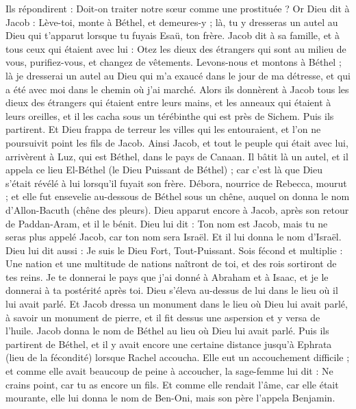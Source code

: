 \begin{multicols}{2}
Ils répondirent : Doit-on traiter notre sœur comme une prostituée ?
\VerseOne{}Or Dieu dit à Jacob : Lève-toi, monte à Béthel, et demeures-y ; là, tu y dresseras un autel au Dieu qui t'apparut lorsque tu fuyais Esaü, ton frère.
Jacob dit à sa famille, et à tous ceux qui étaient avec lui : Otez les dieux des étrangers qui sont au milieu de vous, purifiez-vous, et changez de vêtements.
Levons-nous et montons à Béthel ; là je dresserai un autel au Dieu qui m'a exaucé dans le jour de ma détresse, et qui a été avec moi dans le chemin où j'ai marché.
Alors ils donnèrent à Jacob tous les dieux des étrangers qui étaient entre leurs mains, et les anneaux qui étaient à leurs oreilles, et il les cacha sous un térébinthe qui est près de Sichem.
Puis ils partirent. Et Dieu frappa de terreur les villes qui les entouraient, et l’on ne poursuivit point les fils de Jacob.
Ainsi Jacob, et tout le peuple qui était avec lui, arrivèrent à Luz, qui est Béthel, dans le pays de Canaan.
Il bâtit là un autel, et il appela ce lieu El-Béthel (le Dieu Puissant de Béthel) ; car c’est là que Dieu s’était révélé à lui lorsqu’il fuyait son frère.
Débora,  nourrice de Rebecca, mourut ; et elle fut ensevelie au-dessous de Béthel sous un chêne, auquel on donna le nom d’Allon-Bacuth (chêne des pleurs).
Dieu apparut encore à Jacob, après son retour de Paddan-Aram, et il le bénit.
Dieu lui dit : Ton nom est Jacob, mais tu ne seras plus appelé Jacob, car ton nom sera Israël. Et il lui donna le nom d’Israël.
Dieu lui dit aussi : Je suis le Dieu Fort, Tout-Puissant. Sois fécond et multiplie : Une nation et une multitude de nations naîtront de toi, et des rois sortiront de tes reins.
Je te donnerai le pays que j'ai donné à Abraham et à Isaac, et je le donnerai à ta postérité après toi.
Dieu s’éleva au-dessus de lui dans le lieu où il lui avait parlé.
Et Jacob dressa un monument dans le lieu où Dieu lui avait parlé, à savoir un monument de pierre, et il fit dessus une aspersion et y versa de l'huile.
Jacob donna le nom de Béthel au lieu où Dieu lui avait parlé.
Puis ils partirent de Béthel, et il y avait encore une certaine distance jusqu’à Ephrata (lieu de la fécondité) lorsque Rachel accoucha. Elle eut un accouchement difficile ;
et comme elle avait beaucoup de peine à accoucher, la sage-femme lui dit : Ne crains point, car tu as encore un fils.
Et comme elle rendait l'âme, car elle était mourante, elle lui donna le nom de Ben-Oni, mais son père l’appela Benjamin.

\end{multicols}
